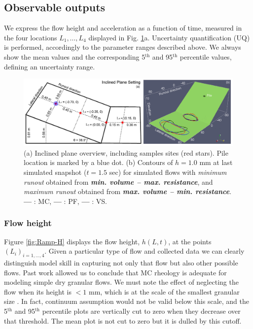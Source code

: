 \documentclass{article}
\begin{document}
\subsection{Observable outputs} \label{Obs1}
We express the flow height and acceleration as a function of time, measured in the four locations $L_1,\dots, L_4$ displayed in Fig. \ref{fig:Ramp-first}a. Uncertainty quantification (UQ) is performed, accordingly to the parameter ranges described above. We always show the mean values and the corresponding 5$^{\mathrm{th}}$ and 95$^{\mathrm{th}}$ percentile values, defining an uncertainty range.
\begin{figure}[H]
    \includegraphics[width=1\textwidth]{figures/incline/InclPlane.jpg}
    \centering
    \caption{(a) Inclined plane overview, including samples sites (red stars). Pile location is marked by a blue dot. (b) Contours of $h = 1.0$ mm at last simulated snapshot ($t = 1.5$ sec) for simulated flows with \emph{minimum runout} obtained from \emph{\textbf{min. volume -- max. resistance}}, and \emph{maximum runout} obtained from \emph{\textbf{max. volume -- min. resistance}}. {\color{red} \textbf{---}} : MC, {\color{blue} \textbf{---}} : PF, \textbf{---} : VS.} \label{fig:Ramp-first}
\end{figure}
\subsubsection{Flow height}
Figure \ref{fig:Ramp-H} displays the flow height, $h(L,t)$, at the points $(L_i)_{i=1,\dots,4}$. Given a particular type of flow and collected data we can clearly distinguish model skill in capturing not only that flow but also other possible flows. Past work \citep{Webb2004} allowed us to conclude that MC rheology is adequate for modeling simple dry granular flows. We must note the effect of neglecting the flow when its height is $<1$ mm, which is at the scale of the smallest granular size \citep{Aghakhani2016}. In fact, continuum assumption would not be valid below this scale, and the 5$^{\mathrm{th}}$ and 95$^{\mathrm{th}}$ percentile plots are vertically cut to zero when they decrease over that threshold. The mean plot is not cut to zero but it is dulled by this cutoff.
\end{document}
